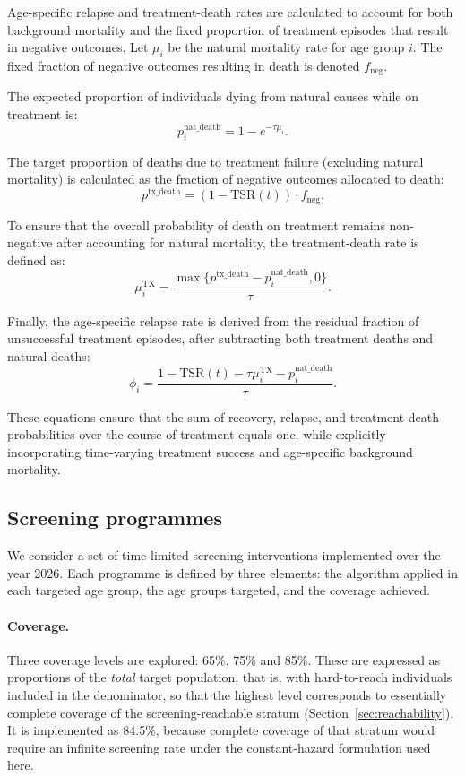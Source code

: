 \documentclass[11pt]{article}
\begin{document}
Age-specific relapse and treatment-death rates are calculated to account for both background mortality and the fixed proportion of treatment episodes that result in negative outcomes. Let \(\mu_i\) be the natural mortality rate for age group \(i\). The fixed fraction of negative outcomes resulting in death is denoted \(f_\text{neg}\).

The expected proportion of individuals dying from natural causes while on treatment is:
\[
p^{\text{nat\_death}}_i = 1 - e^{-\tau \mu_i}.
\]

The target proportion of deaths due to treatment failure (excluding natural mortality) is calculated as the fraction of negative outcomes allocated to death:
\[
p^{\text{tx\_death}} = (1 - \text{TSR}(t)) \cdot f_\text{neg}.
\]

To ensure that the overall probability of death on treatment remains non-negative after accounting for natural mortality, the treatment-death rate is defined as:
\[ 
\mu^{\text{TX}}_i = \frac{\max \{ p^{\text{tx\_death}} - p^{\text{nat\_death}}_i, 0 \}}{\tau}.
\]

Finally, the age-specific relapse rate is derived from the residual fraction of unsuccessful treatment episodes, after subtracting both treatment deaths and natural deaths:
\[
\phi_i = \frac{1 - \text{TSR}(t) - \tau \mu^{\text{TX}}_i - p^{\text{nat\_death}}_i}{\tau}.
\] 

These equations ensure that the sum of recovery, relapse, and treatment-death probabilities over the course of treatment equals one, while explicitly incorporating time-varying treatment success and age-specific background mortality.

\subsection{Screening programmes}

We consider a set of time-limited screening interventions implemented over the year 2026. Each programme is defined by three elements: the algorithm applied in each targeted age group, the age groups targeted, and the coverage achieved.

\paragraph{Coverage.}
Three coverage levels are explored: 65\%, 75\% and 85\%. These are expressed as proportions of the \emph{total} target population, that is, with hard-to-reach individuals included in the denominator, so that the highest level corresponds to essentially complete coverage of the screening-reachable stratum (Section~\ref{sec:reachability}). It is implemented as 84.5\%, because complete coverage of that stratum would require an infinite screening rate under the constant-hazard formulation used here.
\end{document}
